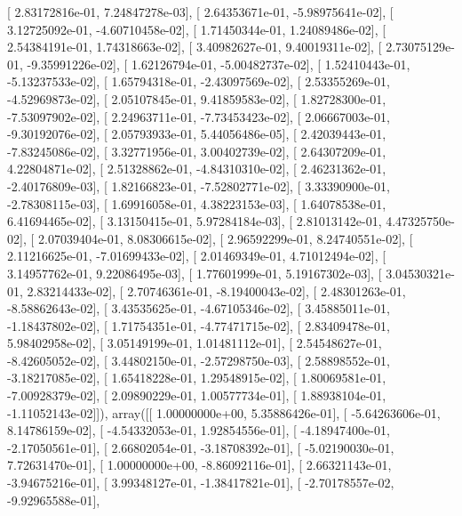 \documentclass{article}
\begin{document}
       [  2.83172816e-01,   7.24847278e-03],
       [  2.64353671e-01,  -5.98975641e-02],
       [  3.12725092e-01,  -4.60710458e-02],
       [  1.71450344e-01,   1.24089486e-02],
       [  2.54384191e-01,   1.74318663e-02],
       [  3.40982627e-01,   9.40019311e-02],
       [  2.73075129e-01,  -9.35991226e-02],
       [  1.62126794e-01,  -5.00482737e-02],
       [  1.52410443e-01,  -5.13237533e-02],
       [  1.65794318e-01,  -2.43097569e-02],
       [  2.53355269e-01,  -4.52969873e-02],
       [  2.05107845e-01,   9.41859583e-02],
       [  1.82728300e-01,  -7.53097902e-02],
       [  2.24963711e-01,  -7.73453423e-02],
       [  2.06667003e-01,  -9.30192076e-02],
       [  2.05793933e-01,   5.44056486e-05],
       [  2.42039443e-01,  -7.83245086e-02],
       [  3.32771956e-01,   3.00402739e-02],
       [  2.64307209e-01,   4.22804871e-02],
       [  2.51328862e-01,  -4.84310310e-02],
       [  2.46231362e-01,  -2.40176809e-03],
       [  1.82166823e-01,  -7.52802771e-02],
       [  3.33390900e-01,  -2.78308115e-03],
       [  1.69916058e-01,   4.38223153e-03],
       [  1.64078538e-01,   6.41694465e-02],
       [  3.13150415e-01,   5.97284184e-03],
       [  2.81013142e-01,   4.47325750e-02],
       [  2.07039404e-01,   8.08306615e-02],
       [  2.96592299e-01,   8.24740551e-02],
       [  2.11216625e-01,  -7.01699433e-02],
       [  2.01469349e-01,   4.71012494e-02],
       [  3.14957762e-01,   9.22086495e-03],
       [  1.77601999e-01,   5.19167302e-03],
       [  3.04530321e-01,   2.83214433e-02],
       [  2.70746361e-01,  -8.19400043e-02],
       [  2.48301263e-01,  -8.58862643e-02],
       [  3.43535625e-01,  -4.67105346e-02],
       [  3.45885011e-01,  -1.18437802e-02],
       [  1.71754351e-01,  -4.77471715e-02],
       [  2.83409478e-01,   5.98402958e-02],
       [  3.05149199e-01,   1.01481112e-01],
       [  2.54548627e-01,  -8.42605052e-02],
       [  3.44802150e-01,  -2.57298750e-03],
       [  2.58898552e-01,  -3.18217085e-02],
       [  1.65418228e-01,   1.29548915e-02],
       [  1.80069581e-01,  -7.00928379e-02],
       [  2.09890229e-01,   1.00577734e-01],
       [  1.88938104e-01,  -1.11052143e-02]]), array([[  1.00000000e+00,   5.35886426e-01],
       [ -5.64263606e-01,   8.14786159e-02],
       [ -4.54332053e-01,   1.92854556e-01],
       [ -4.18947400e-01,  -2.17050561e-01],
       [  2.66802054e-01,  -3.18708392e-01],
       [ -5.02190030e-01,   7.72631470e-01],
       [  1.00000000e+00,  -8.86092116e-01],
       [  2.66321143e-01,  -3.94675216e-01],
       [  3.99348127e-01,  -1.38417821e-01],
       [ -2.70178557e-02,  -9.92965588e-01],
\end{document}
